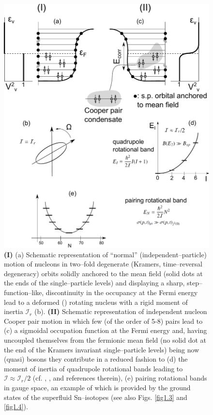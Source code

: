 \begin{figure}[h!]
\centerline{\includegraphics*[width=\textwidth,angle=0]{nutshell/figs/fig1A3.pdf}}
\caption{\textbf{(I)} (a) Schematic representation of ``normal'' (independent--particle) motion of nucleons in  two--fold degenerate (Kramers, time--reversal degeneracy) orbits solidly anchored to the mean field (solid dots at the ends of the single--particle levels) and  displaying a sharp, step--function--like, discontinuity in the occupancy at the Fermi energy  lead to a deformed  (\cite{Nilsson:55}) rotating nucleus with a rigid moment of inertia $\mathcal{I}_r$ (b). \textbf{(II)} Schematic representation of independent nucleon Cooper pair  motion in which few (of the order of 5-8) pairs lead to (c) a sigmoidal occupation function at the Fermi energy and, having uncoupled themselves from the fermionic mean field (no solid dot at the end of the Kramers invariant single--particle levels) being now (quasi) bosons they   contribute in a reduced fashion to (d) the moment of inertia of quadrupole rotational bands leading to $\mathcal{I}\approx\mathcal{I}_r/2$ (cf. \cite{Belyaev:13}, \cite{Belyaev:59}, \cite{Bohr:75} and references therein), (e) pairing rotational bands in gauge space, an example of which is  provided by the ground states of the superfluid Sn--isotopes (see also Figs. \ref{fig1.3} and \ref{fig1.4}).}\label{fig1A3}
\end{figure}

